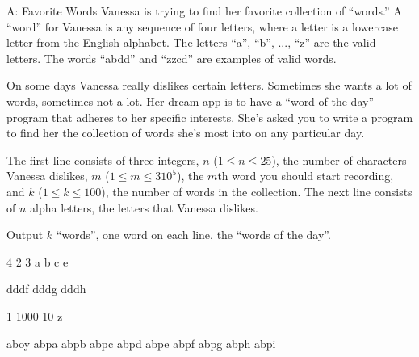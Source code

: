 \begin{problem}{A: Favorite Words}
Vanessa is trying to find her favorite collection of ``words.''
A ``word'' for Vanessa is any sequence of four letters, where a letter is a lowercase letter from the English alphabet.
The letters ``a'', ``b'', ..., ``z'' are the valid letters.
The words ``abdd'' and ``zzcd'' are examples of valid words.

On some days Vanessa really dislikes certain letters.
Sometimes she wants a lot of words, sometimes not a lot.
Her dream app is to have a ``word of the day'' program that adheres to her specific interests.
She's asked you to write a program to find her the collection of words she's most into on any particular day.
\end{problem}

\begin{formalin}
The first line consists of three integers, $n$ ($1 \leq n \leq 25$), the number of characters Vanessa dislikes, $m$ ($1 \leq m \leq 3 \dot 10^5$), the $m$th word you should start recording, and $k$ ($1 \leq k \leq 100$), the number of words in the collection.
The next line consists of $n$ alpha letters, the letters that Vanessa dislikes.
\end{formalin}

\begin{formalout}
Output $k$ ``words'', one word on each line, the ``words of the day''.
\end{formalout}

\begin{datain}
4 2 3
a b c e
\end{datain}
\begin{dataout}
dddf
dddg
dddh
\end{dataout}

\begin{datain}
1 1000 10
z
\end{datain}
\begin{dataout}
aboy
abpa
abpb
abpc
abpd
abpe
abpf
abpg
abph
abpi
\end{dataout}
